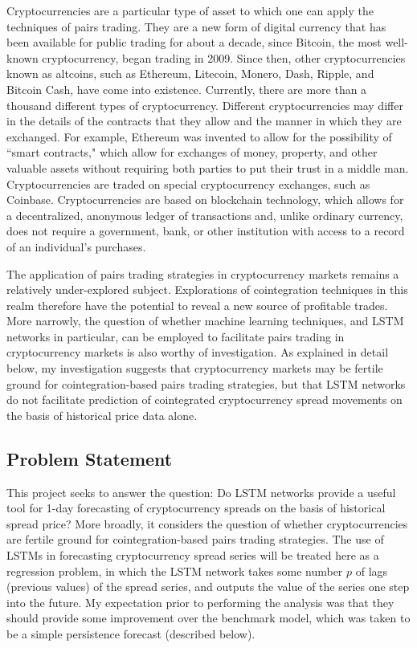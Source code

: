 \documentclass{article}
\begin{document}
Cryptocurrencies are a particular type of asset to which one can apply the techniques of pairs trading. They are a new form of digital currency that has been available for public trading for about a decade, since Bitcoin, the most well-known cryptocurrency, began trading in 2009.  Since then, other cryptocurrencies known as altcoins, such as Ethereum, Litecoin, Monero, Dash, Ripple, and Bitcoin Cash, have come into existence. Currently, there are more than a thousand different types of cryptocurrency. Different cryptocurrencies may differ in the details of the contracts that they allow and the manner in which they are exchanged. For example, Ethereum was invented to allow for the possibility of ``smart contracts," which allow for exchanges of money, property, and other valuable assets without requiring both parties to put their trust in a middle man. Cryptocurrencies are traded on special cryptocurrency exchanges, such as Coinbase. Cryptocurrencies are based on blockchain technology, which allows for a decentralized, anonymous ledger of transactions and, unlike ordinary currency, does not require a government, bank, or other institution with access to a record of an individual's purchases. 

The application of pairs trading strategies in cryptocurrency markets remains a relatively under-explored subject. Explorations of cointegration techniques in this realm therefore have the potential to reveal a new source of profitable trades. More narrowly, the question of whether machine learning techniques, and LSTM networks in particular, can be employed to facilitate pairs trading in cryptocurrency markets is also worthy of investigation. As explained in detail below, my investigation suggests that cryptocurrency markets may be fertile ground for cointegration-based pairs trading strategies, but that LSTM networks do not facilitate prediction of cointegrated cryptocurrency spread movements on the basis of historical price data alone. 

\subsection{Problem Statement}

This project seeks to answer the question: Do LSTM networks provide a useful tool for 1-day forecasting of cryptocurrency spreads on the basis of historical spread price? More broadly, it considers the question of whether cryptocurrencies are fertile ground for cointegration-based pairs trading strategies. The use of LSTMs in forecasting cryptocurrency spread series will be treated here as a regression problem, in which the LSTM network takes some number $p$ of lags (previous values) of the spread series, and outputs the value of the series one step into the future. My expectation prior to performing the analysis was that they should provide some improvement over the benchmark model, which was taken to be a simple persistence forecast (described below). 
\end{document}
